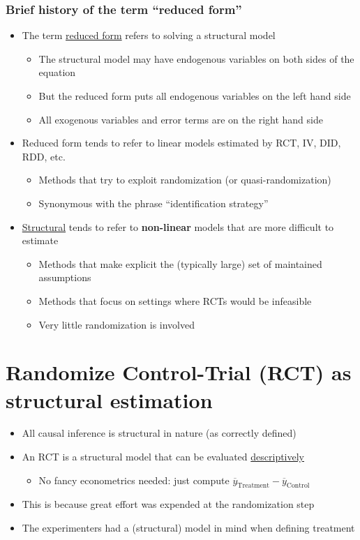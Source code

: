 \documentclass[11pt]{article}
\begin{document}
\subsubsection{Brief history of the term ``reduced form''}
\label{sec:orgd3e182d}

\begin{itemize}
\item The term \uline{reduced form} refers to solving a structural model
\begin{itemize}
\item The structural model may have endogenous variables on both sides of the equation
\item But the reduced form puts all endogenous variables on the left hand side
\item All exogenous variables and error terms are on the right hand side
\end{itemize}
\item Reduced form tends to refer to linear models estimated by RCT, IV, DID, RDD, etc.
\begin{itemize}
\item Methods that try to exploit randomization (or quasi-randomization)
\item Synonymous with the phrase ``identification strategy''
\end{itemize}
\item \uline{Structural} tends to refer to \textbf{non-linear} models that are more difficult to estimate
\begin{itemize}
\item Methods that make explicit the (typically large) set of maintained assumptions
\item Methods that focus on settings where RCTs would be infeasible
\item Very little randomization is involved
\end{itemize}
\end{itemize}

\section{Randomize Control-Trial (RCT) as structural estimation}
\label{sec:orge4a766d}

\begin{itemize}
\item All causal inference is structural in nature (as correctly defined)
\item An RCT is a structural model that can be evaluated \uline{descriptively} 
\begin{itemize}
\item No fancy econometrics needed: just compute \(\overline{y}_{\text{Treatment}} - \overline{y}_{\text{Control}}\)
\end{itemize}
\item This is because great effort was expended at the randomization step
\item The experimenters had a (structural) model in mind when defining treatment
\end{itemize}
\end{document}
